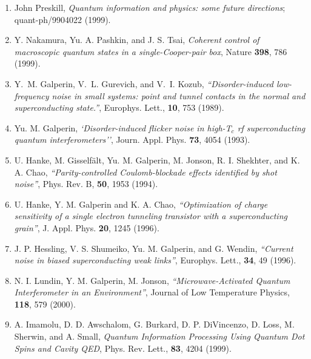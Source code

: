 \begin{enumerate}

\item John Preskill, {\em Quantum information and physics:
some future directions}; quant-ph/9904022 (1999).
\item Y. Nakamura, Yu. A. Pashkin, and  J. S. Tsai, {\sl  Coherent
control of macroscopic quantum states in
a single-Cooper-pair  box}, Nature {\bf 398}, 786 (1999).
\item Y.~M. Galperin, V.~L. Gurevich, and V.~I. Kozub, {\sl
``Disorder-induced  low-frequency   noise   in small systems: point
and tunnel contacts  in the normal and superconducting state.''},
Europhys. Lett., {\bf 10}, 753 (1989).
\item Yu. M. Galperin, {\sl `Disorder-induced flicker noise in
high-T$_c$ rf
superconducting quantum interferometers''}, Journ. Appl. Phys. {\bf
73}, 4054 (1993).
\item U. Hanke, M. Gisself\"alt, Yu. M. Galperin, M. Jonson,
R. I. Shekhter, and K. A. Chao, {\sl ``Parity-controlled
Coulomb-blockade effects identified by shot noise''}, Phys. Rev. B,
{\bf  50}, 1953 (1994).
\item U. Hanke, Y. M. Galperin and K. A. Chao, {\sl ``Optimization
of charge sensitivity of a single electron tunneling transistor with a
superconducting grain''}, J. Appl. Phys. {\bf 20}, 1245 (1996).
\item J. P. Hessling, V. S. Shumeiko, Yu. M. Galperin, and
G. Wendin,
{\sl ``Current noise in biased superconducting weak links''},
Europhys. Lett., {\bf 34}, 49 (1996).
\item N. I. Lundin, Y. M. Galperin, M. Jonson, {\sl
     ``Microwave-Activated Quantum Interferometer in an
     Environment''}, Journal of Low Temperature Physics, {\bf 118},
     579 (2000).
\item A. Imamolu, D. D. Awschalom, G. Burkard,
D. P. DiVincenzo, D. Loss, M. Sherwin, and A. Small, {\sl Quantum
Information Processing Using Quantum Dot Spins and Cavity QED},
Phys. Rev. Lett., {\bf 83},  4204 (1999).

\end{enumerate}











